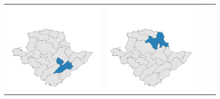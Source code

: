 \begin{figure}[p]
\begin{tabularx}{1\textwidth}{XXXX}
\includegraphics[width=1\linewidth]{images/ch6/mergeoverall/11}&
\includegraphics[width=1\linewidth]{images/ch6/mergeoverall/12} \\

\end{tabularx}
\end{figure}
